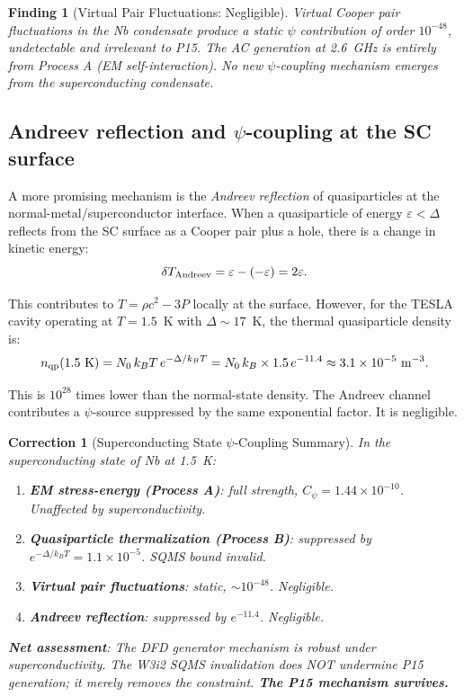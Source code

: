 \documentclass[11pt]{article}
\newtheorem{finding}{Finding}
\newtheorem{correction}{Correction}
\newcommand{\ee}[1]{\times 10^{#1}}
\begin{document}
\begin{finding}[Virtual Pair Fluctuations: Negligible]
\label{find:virtual-pairs}
Virtual Cooper pair fluctuations in the Nb condensate produce a static $\psi$
contribution of order $10^{-48}$, undetectable and irrelevant to P15. The
AC generation at 2.6~GHz is entirely from Process A (EM self-interaction).
No new $\psi$-coupling mechanism emerges from the superconducting condensate.
\end{finding}

\subsection{Andreev reflection and $\psi$-coupling at the SC surface}

A more promising mechanism is the \emph{Andreev reflection} of quasiparticles
at the normal-metal/superconductor interface. When a quasiparticle of energy
$\varepsilon < \Delta$ reflects from the SC surface as a Cooper pair plus a
hole, there is a change in kinetic energy:
\begin{equation}
\delta T_{\rm Andreev} = \varepsilon - (-\varepsilon) = 2\varepsilon.
\end{equation}

This contributes to $T = \rho c^2 - 3P$ locally at the surface. However,
for the TESLA cavity operating at $T = 1.5$~K with $\Delta \sim 17$~K,
the thermal quasiparticle density is:
\begin{equation}
n_{\rm qp}(1.5~{\rm K}) = N_0\,k_B T\,e^{-\Delta/k_B T}
= N_0\,k_B \times 1.5\,e^{-11.4}
\approx 3.1\ee{-5}~{\rm m}^{-3}.
\end{equation}

This is $10^{28}$ times lower than the normal-state density. The Andreev
channel contributes a $\psi$-source suppressed by the same exponential
factor. It is negligible.

\begin{correction}[Superconducting State $\psi$-Coupling Summary]
\label{corr:sc-coupling}
In the superconducting state of Nb at 1.5~K:
\begin{enumerate}
\item \textbf{EM stress-energy (Process A)}: full strength, $C_\psi = 1.44\ee{-10}$.
Unaffected by superconductivity.
\item \textbf{Quasiparticle thermalization (Process B)}: suppressed by
$e^{-\Delta/k_BT} = 1.1\ee{-5}$. SQMS bound invalid.
\item \textbf{Virtual pair fluctuations}: static, $\sim 10^{-48}$. Negligible.
\item \textbf{Andreev reflection}: suppressed by $e^{-11.4}$. Negligible.
\end{enumerate}

\textbf{Net assessment}: The DFD generator mechanism is robust under
superconductivity. The W3i2 SQMS invalidation does NOT undermine P15 generation;
it merely removes the constraint. \textbf{The P15 mechanism survives.}
\end{correction}
\end{document}
